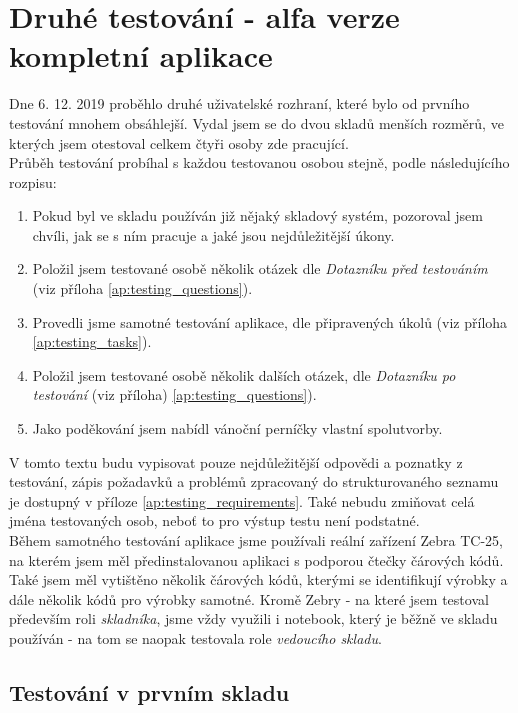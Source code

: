 \section{Druhé testování - alfa verze kompletní aplikace}

Dne 6. 12. 2019 proběhlo druhé uživatelské rozhraní, které bylo od prvního testování mnohem obsáhlejší. Vydal jsem se do dvou skladů menších rozměrů, ve kterých jsem otestoval celkem čtyři osoby zde pracující.\\
Průběh testování probíhal s každou testovanou osobou stejně, podle následujícího rozpisu:
\begin{enumerate}
	\item Pokud byl ve skladu používán již nějaký skladový systém, pozoroval jsem chvíli, jak se s ním pracuje a jaké jsou nejdůležitější úkony.
	\item Položil jsem testované osobě několik otázek dle \emph{Dotazníku před testováním} (viz příloha \ref{ap:testing_questions}).
	\item Provedli jsme samotné testování aplikace, dle připravených úkolů (viz příloha \ref{ap:testing_tasks}).
	\item Položil jsem testované osobě několik dalších otázek, dle \emph{Dotazníku po testování} (viz příloha) \ref{ap:testing_questions}).
	\item Jako poděkování jsem nabídl vánoční perníčky vlastní spolutvorby.
\end{enumerate}

V tomto textu budu vypisovat pouze nejdůležitější odpovědi a poznatky z testování, zápis požadavků a problémů zpracovaný do strukturovaného seznamu je dostupný v příloze \ref{ap:testing_requirements}. Také nebudu zmiňovat celá jména testovaných osob, neboť to pro výstup testu není podstatné.
\\
Během samotného testování aplikace jsme používali reální zařízení Zebra TC-25, na kterém jsem měl předinstalovanou aplikaci s podporou čtečky čárových kódů. Také jsem měl vytištěno několik čárových kódů, kterými se identifikují výrobky a dále několik kódů pro výrobky samotné. Kromě Zebry - na které jsem testoval především roli \emph{skladníka}, jsme vždy využili i notebook, který je běžně ve skladu používán - na tom se naopak testovala role \emph{vedoucího skladu}.


\subsection{Testování v prvním skladu}

